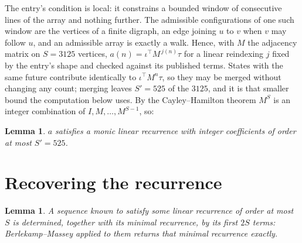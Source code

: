\documentclass[11pt,a4paper]{article}
\theoremstyle{plain}
\newtheorem{lemma}[theorem]{Lemma}
\theoremstyle{definition}
\begin{document}
The entry's condition is local: it constrains a bounded window of consecutive lines of the
array and nothing further. The admissible configurations of one such window are the vertices
of a finite digraph, an edge joining $u$ to $v$ when $v$ may follow $u$, and an admissible
array is exactly a walk. Hence, with $M$ the adjacency matrix on $S=3125$ vertices,
$a(n)=\iota^{\!\top}M^{\,j(n)}\tau$ for a linear reindexing $j$ fixed by the entry's shape
and checked against its published terms. States with the same future contribute identically to $\iota^{\!\top}M^n\tau$, so they may be merged without changing any count; merging leaves $S'=525$ of the $3125$, and it is that smaller bound the computation below uses. By the Cayley--Hamilton theorem $M^{S}$ is an
integer combination of $I,M,\dots,M^{S-1}$, so:

\begin{lemma}\label{lem:cf}
$a$ satisfies a monic linear recurrence with integer coefficients of order at most
$S'=525$.
\end{lemma}

\section{Recovering the recurrence}

\begin{lemma}\label{lem:bm}
A sequence known to satisfy some linear recurrence of order at most $S$ is determined, together
with its minimal recurrence, by its first $2S$ terms: Berlekamp--Massey applied to them returns
that minimal recurrence exactly.
\end{lemma}
\end{document}
